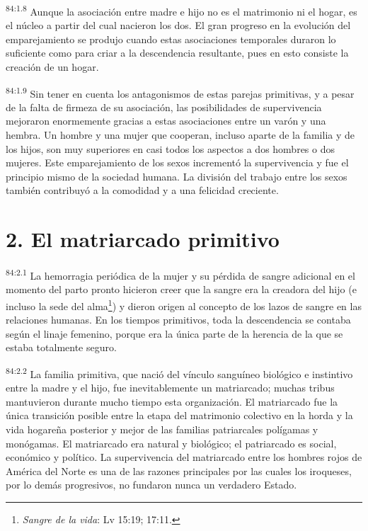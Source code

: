 \documentclass[twoside, 11pt]{book}
\begin{document}
\par
\textsuperscript{84:1.8} Aunque la asociación entre madre e hijo no es el matrimonio ni el hogar, es el núcleo a partir del cual nacieron los dos. El gran progreso en la evolución del emparejamiento se produjo cuando estas asociaciones temporales duraron lo suficiente como para criar a la descendencia resultante, pues en esto consiste la creación de un hogar.

\par
\textsuperscript{84:1.9} Sin tener en cuenta los antagonismos de estas parejas primitivas, y a pesar de la falta de firmeza de su asociación, las posibilidades de supervivencia mejoraron enormemente gracias a estas asociaciones entre un varón y una hembra. Un hombre y una mujer que cooperan, incluso aparte de la familia y de los hijos, son muy superiores en casi todos los aspectos a dos hombres o dos mujeres. Este emparejamiento de los sexos incrementó la supervivencia y fue el principio mismo de la sociedad humana. La división del trabajo entre los sexos también contribuyó a la comodidad y a una felicidad creciente.

\section*{2. El matriarcado primitivo}
\par
\textsuperscript{84:2.1} La hemorragia periódica de la mujer y su pérdida de sangre adicional en el momento del parto pronto hicieron creer que la sangre era la creadora del hijo (e incluso la sede del alma\footnote{\textit{Sangre de la vida}: Lv 15:19; 17:11.}) y dieron origen al concepto de los lazos de sangre en las relaciones humanas. En los tiempos primitivos, toda la descendencia se contaba según el linaje femenino, porque era la única parte de la herencia de la que se estaba totalmente seguro.

\par
\textsuperscript{84:2.2} La familia primitiva, que nació del vínculo sanguíneo biológico e instintivo entre la madre y el hijo, fue inevitablemente un matriarcado; muchas tribus mantuvieron durante mucho tiempo esta organización. El matriarcado fue la única transición posible entre la etapa del matrimonio colectivo en la horda y la vida hogareña posterior y mejor de las familias patriarcales polígamas y monógamas. El matriarcado era natural y biológico; el patriarcado es social, económico y político. La supervivencia del matriarcado entre los hombres rojos de América del Norte es una de las razones principales por las cuales los iroqueses, por lo demás progresivos, no fundaron nunca un verdadero Estado.
\end{document}
